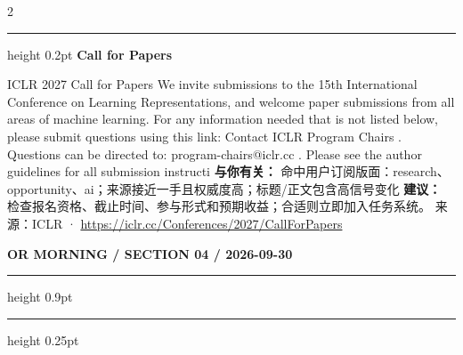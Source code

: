 \documentclass[10.5pt]{ctexart}
\begin{document}
\begin{multicols}{2}
\vspace{2mm}
\hrule height 0.2pt
\vspace{2mm}
{\large\bfseries Call for Papers}\par
ICLR 2027 Call for Papers We invite submissions to the 15th International Conference on Learning Representations, and welcome paper submissions from all areas of machine learning. For any information needed that is not listed below, please submit questions using this link: Contact ICLR Program Chairs . Questions can be directed to: program-chairs@iclr.cc . Please see the author guidelines for all submission instructi
\textbf{与你有关：} 命中用户订阅版面：research、opportunity、ai；来源接近一手且权威度高；标题/正文包含高信号变化
\textbf{建议：} 检查报名资格、截止时间、参与形式和预期收益；合适则立即加入任务系统。
{\footnotesize\color{ormuted} 来源：ICLR · \url{https://iclr.cc/Conferences/2027/CallForPapers}}
\end{multicols}
\newpage
{\small\bfseries OR MORNING / SECTION 04 / 2026-09-30}
\vspace{2mm}
\hrule height 0.9pt
\vspace{1.5mm}
\hrule height 0.25pt
\vspace{4mm}
\end{document}
